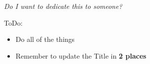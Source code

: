 \thispagestyle{empty}
{}

\vspace*{5cm}

\begin{center}
\textit{Do I want to dedicate this to someone?}


\end{center}

 \color{red}
 \begin{center}
 ToDo:

 \begin{itemize}
     \item Do all of the things
     \item Remember to update the Title in \textbf{2 places}
    
 \end{itemize}
 \end{center}

\listofnotes

 \color{black}